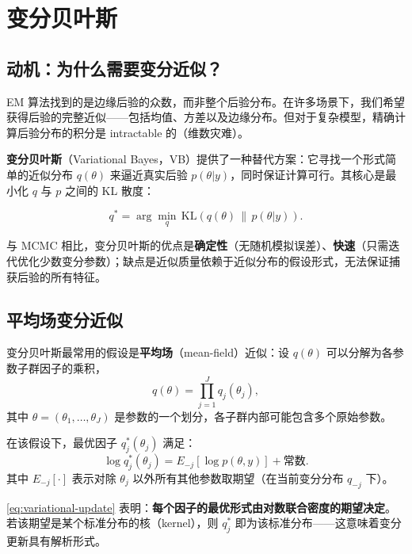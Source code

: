 \section{变分贝叶斯}\label{sec:variational-bayes}

\subsection{动机：为什么需要变分近似？}\label{sec:variational-motivation}

EM 算法找到的是边缘后验的众数，而非整个后验分布。在许多场景下，我们希望获得后验的完整近似——包括均值、方差以及边缘分布。但对于复杂模型，精确计算后验分布的积分是 intractable 的（维数灾难）。

\textbf{变分贝叶斯}（Variational Bayes，VB）提供了一种替代方案：它寻找一个形式简单的近似分布 $q(\theta)$ 来逼近真实后验 $p(\theta|y)$，同时保证计算可行。其核心是最小化 $q$ 与 $p$ 之间的 KL 散度：

\[
q^* = \arg\min_q \, \text{KL}\!\left( q(\theta) \, \| \, p(\theta|y) \right).
\]

与 MCMC 相比，变分贝叶斯的优点是\textbf{确定性}（无随机模拟误差）、\textbf{快速}（只需迭代优化少数变分参数）；缺点是近似质量依赖于近似分布的假设形式，无法保证捕获后验的所有特征。

\subsection{平均场变分近似}\label{sec:mean-field}

变分贝叶斯最常用的假设是\textbf{平均场}（mean-field）近似：设 $q(\theta)$ 可以分解为各参数子群因子的乘积，
\[
q(\theta) = \prod_{j=1}^J q_j(\theta_j),
\]
其中 $\theta = (\theta_1, \ldots, \theta_J)$ 是参数的一个划分，各子群内部可能包含多个原始参数。

在该假设下，最优因子 $q_j^*(\theta_j)$ 满足：
\[
\log q_j^*(\theta_j) = E_{-j}\!\left[ \log p(\theta, y) \right] + \text{常数}.
\label{eq:variational-update}
\]
其中 $E_{-j}[\cdot]$ 表示对除 $\theta_j$ 以外所有其他参数取期望（在当前变分分布 $q_{-j}$ 下）。

\cref{eq:variational-update} 表明：\textbf{每个因子的最优形式由对数联合密度的期望决定}。若该期望是某个标准分布的核（kernel），则 $q_j^*$ 即为该标准分布——这意味着变分更新具有解析形式。


